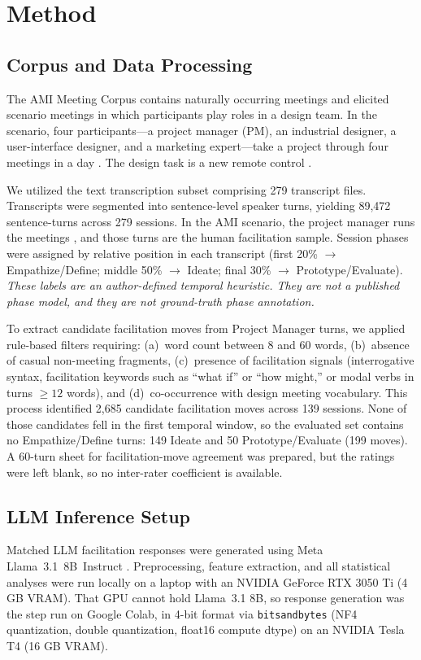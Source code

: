 \documentclass[10pt,journal,compsoc]{IEEEtran}
\begin{document}
\section{Method}
\subsection{Corpus and Data Processing}
The AMI Meeting Corpus \cite{carletta2005ami} contains naturally occurring meetings and elicited scenario meetings in which participants play roles in a design team. In the scenario, four participants---a project manager (PM), an industrial designer, a user-interface designer, and a marketing expert---take a project through four meetings in a day \cite{carletta2006elra}. The design task is a new remote control \cite{ami2006scenario}.

We utilized the text transcription subset comprising 279 transcript files. Transcripts were segmented into sentence-level speaker turns, yielding 89,472 sentence-turns across 279 sessions. In the AMI scenario, the project manager runs the meetings \cite{carletta2006elra}, and those turns are the human facilitation sample. Session phases were assigned by relative position in each transcript (first 20\% $\rightarrow$ Empathize/Define; middle 50\% $\rightarrow$ Ideate; final 30\% $\rightarrow$ Prototype/Evaluate). \emph{These labels are an author-defined temporal heuristic. They are not a published phase model, and they are not ground-truth phase annotation.}

To extract candidate facilitation moves from Project Manager turns, we applied rule-based filters requiring: (a)~word count between 8 and 60 words, (b)~absence of casual non-meeting fragments, (c)~presence of facilitation signals (interrogative syntax, facilitation keywords such as ``what if'' or ``how might,'' or modal verbs in turns $\ge 12$ words), and (d)~co-occurrence with design meeting vocabulary. This process identified 2,685 candidate facilitation moves across 139 sessions. None of those candidates fell in the first temporal window, so the evaluated set contains no Empathize/Define turns: 149 Ideate and 50 Prototype/Evaluate (199 moves). A 60-turn sheet for facilitation-move agreement was prepared, but the ratings were left blank, so no inter-rater coefficient is available.

\subsection{LLM Inference Setup}
Matched LLM facilitation responses were generated using Meta Llama~3.1~8B~Instruct \cite{dubey2024llama3}. Preprocessing, feature extraction, and all statistical analyses were run locally on a laptop with an NVIDIA GeForce RTX 3050 Ti (4 GB VRAM). That GPU cannot hold Llama~3.1 8B, so response generation was the step run on Google Colab, in 4-bit format via \texttt{bitsandbytes} (NF4 quantization, double quantization, float16 compute dtype) on an NVIDIA Tesla T4 (16 GB VRAM).
\end{document}
